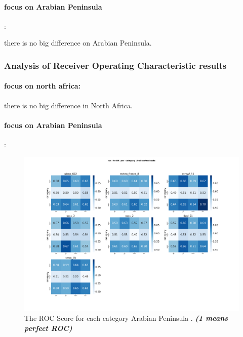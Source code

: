 \paragraph{focus on Arabian Peninsula}:

there is no big difference on Arabian Peninsula.
\subsubsection{Analysis of Receiver Operating Characteristic results}
\paragraph{focus on north africa:}

there is no big difference in North Africa.
	
\paragraph{focus on Arabian Peninsula}:



\begin{figure}[H]
    \centering
    \includegraphics[scale=0.25]{plots/prob/roc/roc_RR_category_ArabianPeninsula.png}
    \caption{The ROC Score for each category Arabian Peninsula . \textbf{\textit{(1 means perfect ROC)}}}
\end{figure}



